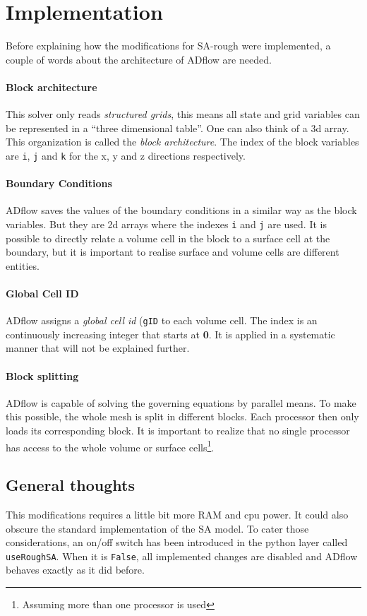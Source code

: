 \section{Implementation}
Before explaining how the modifications for SA-rough were implemented, a couple
of words about the architecture of ADflow are needed.

\paragraph{Block architecture}
This solver only reads \textit{structured grids}, this means all state and grid
variables can be represented in a ``three dimensional table''. One can also think
of a 3d array. This organization is called the \textit{block architecture}. The
index of the block variables are \texttt{i}, \texttt{j} and \texttt{k} for the
x, y and z directions respectively.

\paragraph{Boundary Conditions}
ADflow saves the values of the boundary conditions in a similar way as the block
variables. But they are 2d arrays where the indexes \texttt{i} and \texttt{j}
are used. It is possible to directly relate a volume cell in the block to a
surface cell at the boundary, but it is important to realise surface and volume
cells are different entities.

\paragraph{Global Cell ID}
ADflow assigns a \textit{global cell id} (\texttt{gID} to each volume cell. The
index is an continuously increasing integer that starts at \textbf{0}. It is
applied in a systematic manner that will not be explained further.

\paragraph{Block splitting}
ADflow is capable of solving the governing equations by parallel means. To make
this possible, the whole mesh is split in different blocks. Each processor then
only loads its corresponding block. It is important to realize that no single
processor has access to the whole volume or surface cells\footnote{Assuming more
than one processor is used}.

\subsection{General thoughts}
This modifications requires a little bit more RAM and cpu power. It could also
obscure the standard implementation of the SA model. To cater those
considerations, an on/off switch has been introduced in the python layer called
\texttt{useRoughSA}. When it is \texttt{False}, all implemented changes are
disabled and ADflow behaves exactly as it did before.


